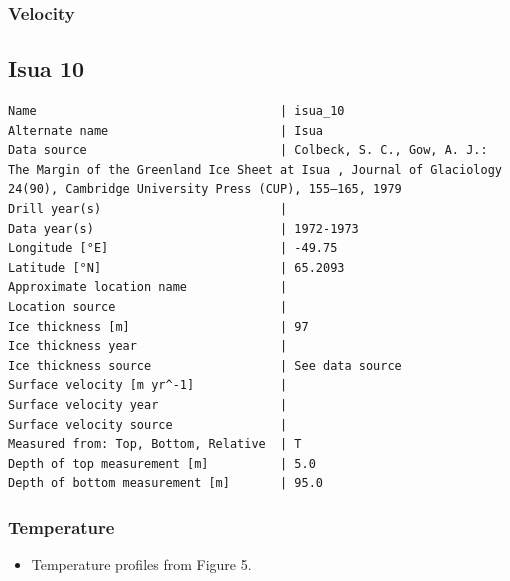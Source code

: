 \documentclass[article,a4paper,times,11pt,twoside]{article}
\begin{document}
\subsubsection{Velocity}
\label{sec:orgc366d1e}
\clearpage
\subsection{Isua 10}
\label{sec:orgabd5b42}
\begin{verbatim}
Name                                  | isua_10
Alternate name                        | Isua
Data source                           | Colbeck, S. C., Gow, A. J.: The Margin of the Greenland Ice Sheet at Isua , Journal of Glaciology 24(90), Cambridge University Press (CUP), 155–165, 1979 
Drill year(s)                         | 
Data year(s)                          | 1972-1973
Longitude [°E]                        | -49.75
Latitude [°N]                         | 65.2093
Approximate location name             | 
Location source                       | 
Ice thickness [m]                     | 97
Ice thickness year                    | 
Ice thickness source                  | See data source
Surface velocity [m yr^-1]            | 
Surface velocity year                 | 
Surface velocity source               | 
Measured from: Top, Bottom, Relative  | T
Depth of top measurement [m]          | 5.0
Depth of bottom measurement [m]       | 95.0
\end{verbatim}

\subsubsection{Temperature}
\label{sec:org342c83b}

\begin{itemize}
\item Temperature profiles from \textcite{colbeck_1979} Figure 5.
\end{itemize}
\end{document}
